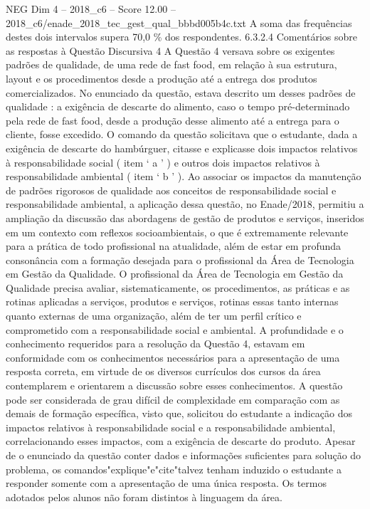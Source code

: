 \begin{textsample}{NEG Dim 4 – 2018\_c6 – Score 12.00 – 2018\_c6/enade\_2018\_tec\_gest\_qual\_bbbd005b4c.txt}
A soma das frequências destes dois intervalos supera 70,0 \% dos respondentes. 6.3.2.4 Comentários sobre as respostas à Questão Discursiva 4 A Questão 4 versava sobre os exigentes padrões de qualidade, de uma rede de fast food, em relação à sua estrutura, layout e os procedimentos desde a produção até a entrega dos produtos comercializados.
No enunciado da questão, estava descrito um desses padrões de qualidade : a exigência de descarte do alimento, caso o tempo pré-determinado pela rede de fast food, desde a produção desse alimento até a entrega para o cliente, fosse excedido.
O comando da questão solicitava que o estudante, dada a exigência de descarte do hambúrguer, citasse e explicasse dois impactos relativos à responsabilidade social ( item ‘ a ’ ) e outros dois impactos relativos à responsabilidade ambiental ( item ‘ b ’ ).
Ao associar os impactos da manutenção de padrões rigorosos de qualidade aos conceitos de responsabilidade social e responsabilidade ambiental, a aplicação dessa questão, no Enade/2018, permitiu a ampliação da discussão das abordagens de gestão de produtos e serviços, inseridos em um contexto com reflexos socioambientais, o que é extremamente relevante para a prática de todo profissional na atualidade, além de estar em profunda consonância com a formação desejada para o profissional da Área de Tecnologia em Gestão da Qualidade.
O profissional da Área de Tecnologia em Gestão da Qualidade precisa avaliar, sistematicamente, os procedimentos, as práticas e as rotinas aplicadas a serviços, produtos e serviços, rotinas essas tanto internas quanto externas de uma organização, além de ter um perfil crítico e comprometido com a responsabilidade social e ambiental.
A profundidade e o conhecimento requeridos para a resolução da Questão 4, estavam em conformidade com os conhecimentos necessários para a apresentação de uma resposta correta, em virtude de os diversos currículos dos cursos da área contemplarem e orientarem a discussão sobre esses conhecimentos.
A questão pode ser considerada de grau difícil de complexidade em comparação com as demais de formação específica, visto que, solicitou do estudante a indicação dos impactos relativos à responsabilidade social e a responsabilidade ambiental, correlacionando esses impactos, com a exigência de descarte do produto.
Apesar de o enunciado da questão conter dados e informações suficientes para solução do problema, os comandos"explique"e"cite"talvez tenham induzido o estudante a responder somente com a apresentação de uma única resposta.
Os termos adotados pelos alunos não foram distintos à linguagem da área.

\end{textsample}
